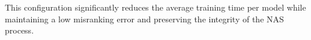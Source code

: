 This configuration significantly reduces the average training time per model while maintaining a low misranking error and preserving the integrity of the NAS process.

